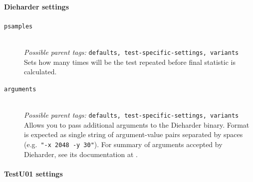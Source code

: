 \documentclass[
	digital,    %
	oneside,
	color,
	11pt,
	nocover,
	notable,
	nolof,
	nolot,
]{fithesis3}
\theoremstyle{definition}
\theoremstyle{remark}
\begin{document}
\paragraph{Dieharder settings}

\begin{description}
\item[\texttt{psamples}] \hfill \\
\textit{Possible parent tags: } \texttt{defaults, test-specific-settings, variants} \\
Sets how many times will be the test repeated before final statistic is calculated.

\item[\texttt{arguments}] \hfill \\
\textit{Possible parent tags: } \texttt{defaults, test-specific-settings, variants} \\
Allows you to pass additional arguments to the Dieharder binary. Format is expected as single string of argument-value pairs separated by spaces (e.g.~\texttt{"-x 2048 -y 30"}). For summary of arguments accepted by Dieharder, see its documentation at \cite{dieharder-manpage}.

\end{description}

\paragraph{TestU01 settings}
\end{document}
